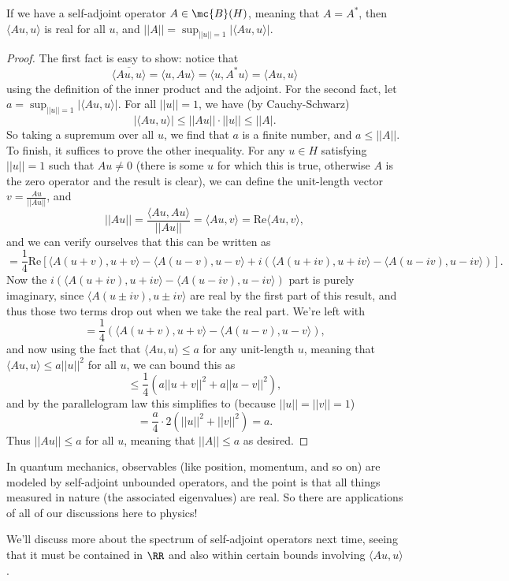 \begin{theorem}
If we have a self-adjoint operator $A \in \mc{B}(H)$, meaning that $A = A^\ast$, then $\langle Au, u \rangle$ is real for all $u$, and $||A|| = \sup_{||u|| = 1} |\langle Au, u \rangle|$.
\end{theorem}
\begin{proof}
The first fact is easy to show: notice that
\[
    \overline{\langle Au, u \rangle} = \langle u, Au \rangle = \langle u, A^\ast u \rangle = \langle Au, u \rangle
\]
using the definition of the inner product and the adjoint. For the second fact, let $a = \sup_{||u|| = 1} |\langle Au, u \rangle|$. For all $||u|| = 1$, we have (by Cauchy-Schwarz)
\[
    |\langle Au, u \rangle| \le ||Au|| \cdot ||u|| \le ||A|.
\]
So taking a supremum over all $u$, we find that $a$ is a finite number, and $a \le ||A||$. To finish, it suffices to prove the other inequality. For any $u \in H$ satisfying $||u|| = 1$ such that $Au \ne 0$ (there is some $u$ for which this is true, otherwise $A$ is the zero operator and the result is clear), we can define the unit-length vector $v = \frac{Au}{||Au||}$, and 
\[
    ||Au|| = \frac{\langle Au, Au \rangle}{||Au||} = \langle Au, v \rangle = \text{Re}\langle Au, v \rangle, 
\]
and we can verify ourselves that this can be written as 
\[
    = \frac{1}{4} \text{Re}\left[ \langle A(u+v), u+v \rangle - \langle A(u-v), u-v\rangle + i\left(\langle A(u+iv), u+iv \rangle - \langle A(u-iv), u-iv \rangle\right)\right].
\]
Now the $i\left(\langle A(u+iv), u+iv \rangle - \langle A(u-iv), u-iv \rangle\right)$ part is purely imaginary, since $\langle A(u\pm iv), u\pm iv \rangle$ are real by the first part of this result, and thus those two terms drop out when we take the real part. We're left with 
\[
    = \frac{1}{4} \left(\langle A(u+v), u+v \rangle - \langle A(u-v), u-v \rangle \right),
\]
and now using the fact that $\langle Au, u \rangle \le a$ for any unit-length $u$, meaning that $\langle Au, u \rangle \le a ||u||^2$ for all $u$, we can bound this as
\[
    \le \frac{1}{4} (a||u+v||^2 + a||u-v||^2),
\]
and by the parallelogram law this simplifies to (because $||u|| = ||v|| = 1$)
\[
    = \frac{a}{4} \cdot 2 (||u||^2 + ||v||^2) = a.
\]
Thus $||Au|| \le a$ for all $u$, meaning that $||A|| \le a$ as desired.
\end{proof}

\begin{remark}
In quantum mechanics, observables (like position, momentum, and so on) are modeled by self-adjoint unbounded operators, and the point is that all things measured in nature (the associated eigenvalues) are real. So there are applications of all of our discussions here to physics!
\end{remark}

We'll discuss more about the spectrum of self-adjoint operators next time, seeing that it must be contained in $\RR$ and also within certain bounds involving $\langle Au, u \rangle$. 